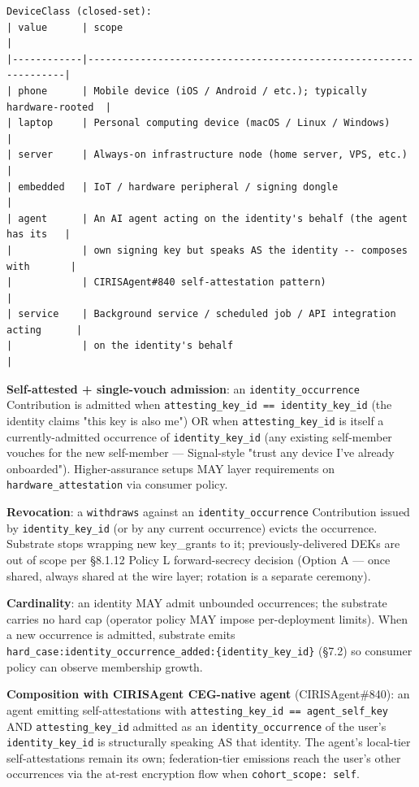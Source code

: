 \documentclass[10pt]{article}
\begin{document}
\begin{lstlisting}
DeviceClass (closed-set):
| value      | scope                                                            |
|------------|------------------------------------------------------------------|
| phone      | Mobile device (iOS / Android / etc.); typically hardware-rooted  |
| laptop     | Personal computing device (macOS / Linux / Windows)              |
| server     | Always-on infrastructure node (home server, VPS, etc.)           |
| embedded   | IoT / hardware peripheral / signing dongle                       |
| agent      | An AI agent acting on the identity's behalf (the agent has its   |
|            | own signing key but speaks AS the identity -- composes with       |
|            | CIRISAgent#840 self-attestation pattern)                         |
| service    | Background service / scheduled job / API integration acting      |
|            | on the identity's behalf                                          |
\end{lstlisting}

\textbf{Self-attested + single-vouch admission}: an \texttt{identity\_occurrence} Contribution is admitted when \texttt{attesting\_key\_id == identity\_key\_id} (the identity claims "this key is also me") OR when \texttt{attesting\_key\_id} is itself a currently-admitted occurrence of \texttt{identity\_key\_id} (any existing self-member vouches for the new self-member — Signal-style "trust any device I've already onboarded"). Higher-assurance setups MAY layer requirements on \texttt{hardware\_attestation} via consumer policy.


\textbf{Revocation}: a \texttt{withdraws} against an \texttt{identity\_occurrence} Contribution issued by \texttt{identity\_key\_id} (or by any current occurrence) evicts the occurrence. Substrate stops wrapping new key\_grants to it; previously-delivered DEKs are out of scope per §8.1.12 Policy L forward-secrecy decision (Option A — once shared, always shared at the wire layer; rotation is a separate ceremony).


\textbf{Cardinality}: an identity MAY admit unbounded occurrences; the substrate carries no hard cap (operator policy MAY impose per-deployment limits). When a new occurrence is admitted, substrate emits \texttt{hard\_case:identity\_occurrence\_added:\{identity\_key\_id\}} (§7.2) so consumer policy can observe membership growth.


\textbf{Composition with CIRISAgent CEG-native agent} (CIRISAgent\#840): an agent emitting self-attestations with \texttt{attesting\_key\_id == agent\_self\_key} AND \texttt{attesting\_key\_id} admitted as an \texttt{identity\_occurrence} of the user's \texttt{identity\_key\_id} is structurally speaking AS that identity. The agent's local-tier self-attestations remain its own; federation-tier emissions reach the user's other occurrences via the at-rest encryption flow when \texttt{cohort\_scope: self}.
\end{document}
